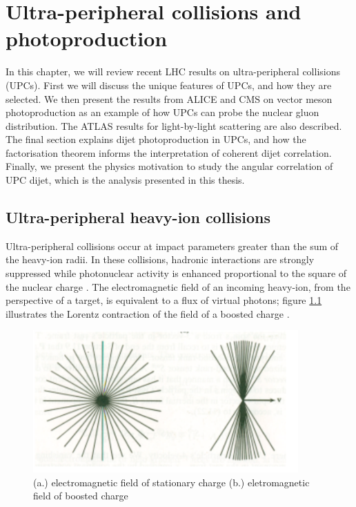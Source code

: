 \setlength\abovedisplayskip{0.4pt}
\setlength\belowdisplayskip{0.4pt}

\chapter{Ultra-peripheral collisions and photoproduction}

In this chapter, we will review recent LHC results on ultra-peripheral collisions (UPCs). First we will discuss the unique features of UPCs, and how they are selected. We then present the results from ALICE and CMS on vector meson photoproduction as an example of how UPCs can probe the nuclear gluon distribution. The ATLAS results for light-by-light scattering are also described. The final section explains dijet photoproduction in UPCs, and how the factorisation theorem informs the interpretation of coherent dijet correlation. Finally, we present the physics motivation to study the angular correlation of UPC dijet, which is the analysis presented in this thesis. 

\section{Ultra-peripheral heavy-ion collisions}

Ultra-peripheral collisions occur at impact parameters greater than the sum of the heavy-ion radii. In these collisions, hadronic interactions are strongly suppressed while photonuclear activity is enhanced proportional to the square of the nuclear charge \cite{Hands:2001ve}. The electromagnetic field of an incoming heavy-ion, from the perspective of a target, is equivalent to a flux of virtual photons; figure \ref{fig:smushedField} illustrates the Lorentz contraction of the field of a boosted charge \cite{Baltz:2007kq}\cite{WWJackson}.

\begin{figure}[h!]
\begin{centering}
\includegraphics[width=4in]{Chapter1/importfigs/jackson_em_wwa.png}
\par\end{centering}
\caption{ (a.) electromagnetic field of stationary charge (b.) eletromagnetic field of boosted charge \cite{WWJackson} \label{fig:smushedField}}
\end{figure}

